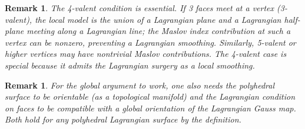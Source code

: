 \documentclass[12pt]{article}
\newtheorem{remark}[theorem]{Remark}
\begin{document}
\begin{remark}
The 4-valent condition is essential.  If 3 faces meet at a vertex (3-valent), the local model is the union of a Lagrangian plane and a Lagrangian half-plane meeting along a Lagrangian line; the Maslov index contribution at such a vertex can be nonzero, preventing a Lagrangian smoothing.  Similarly, 5-valent or higher vertices may have nontrivial Maslov contributions.  The 4-valent case is special because it admits the Lagrangian surgery as a local smoothing.
\end{remark}

\begin{remark}
For the global argument to work, one also needs the polyhedral surface to be orientable (as a topological manifold) and the Lagrangian condition on faces to be compatible with a global orientation of the Lagrangian Gauss map.  Both hold for any polyhedral Lagrangian surface by the definition.
\end{remark}
\end{document}
